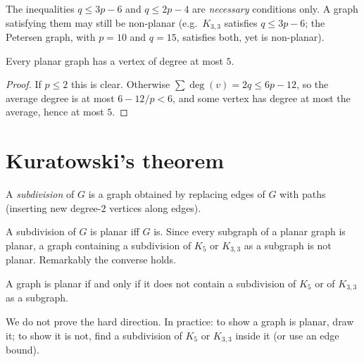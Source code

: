 \begin{important}[Pitfall]
The inequalities $q \le 3p-6$ and $q\le 2p-4$ are \emph{necessary} conditions only. A graph
satisfying them may still be non-planar (e.g.\ $K_{3,3}$ satisfies $q \le 3p-6$; the Petersen graph,
with $p = 10$ and $q = 15$, satisfies both, yet is non-planar).
\end{important}

\begin{corollary}
Every planar graph has a vertex of degree at most $5$.
\end{corollary}
\begin{proof}
If $p \le 2$ this is clear. Otherwise $\sum\deg(v) = 2q \le 6p - 12$, so the average degree is at
most $6 - 12/p < 6$, and some vertex has degree at most the average, hence at most $5$.
\end{proof}

\section{Kuratowski's theorem}

\begin{definition}
A \emph{subdivision} of $G$ is a graph obtained by replacing edges of $G$ with paths (inserting
new degree-$2$ vertices along edges).
\end{definition}

A subdivision of $G$ is planar iff $G$ is. Since every subgraph of a planar graph is planar, a
graph containing a subdivision of $K_5$ or $K_{3,3}$ as a subgraph is not planar. Remarkably the
converse holds.

\begin{theorem}[Kuratowski]
A graph is planar if and only if it does not contain a subdivision of $K_5$ or of $K_{3,3}$ as a
subgraph.
\end{theorem}

We do not prove the hard direction. In practice: to show a graph is planar, draw it; to show it is
not, find a subdivision of $K_5$ or $K_{3,3}$ inside it (or use an edge bound).

\begin{center}
\end{center}

